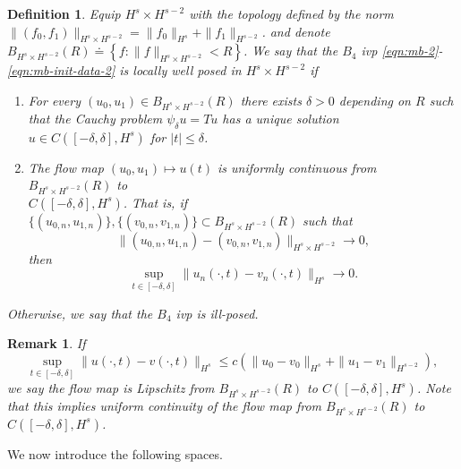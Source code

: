 \documentclass[12pt,reqno]{amsart}
\numberwithin{equation}{section}  %
\newtheorem{definition}[theorem]{Definition}
\newtheorem{remark}[theorem]{Remark}
\begin{document}
\begin{definition}
  Equip $H^{s} \times H^{s-2}$ with the 
  topology defined by the norm $\|(f_0, f_1)\|_{H^{s} \times H^{s-2}}
  = \|f_0\|_{H^{s}} + \|f_1\|_{H^{s-2}}$.
  and denote $B_{H^{s} \times H^{s-2}}(R) \doteq \left\{ f: \| f \|_{H^{s} \times
  H^{s-2}} < R
  \right\}$. We say that the $B_{4}$ ivp
  \eqref{eqn:mb-2}-\eqref{eqn:mb-init-data-2} is
	\emph{locally well posed} in
  $H^s \times H^{s-2}$ if 
	\begin{enumerate}
    \item For every $(u_{0}, u_{1}) \in B_{H^{s} \times H^{s-2}}(R)$
      there exists $\delta>0$ depending on $R$ such that the Cauchy problem
      $\psi_{\delta} u = Tu$ has a unique solution $u \in C([-\delta,
      \delta], H^s)$ for $ |t| \le \delta$.
    \item
      The flow map $(u_0, u_{1}) \mapsto u(t)$ is uniformly continuous from
      $B_{H^{s} \times H^{s-2}}(R)$ to \\ $C(\left[ -\delta, \delta \right], H^s)$. That is, if
      $\{(u_{0,n}, u_{1,n} ) \}, \{(v_{0,n}, v_{1,n} )\}
      \subset B_{H^{s} \times H^{s-2}}(R)$ such that $$\|(u_{0,n}, u_{1,n}) -
      (v_{0,n}, v_{1,n}) \|_{H^{s} \times H^{s-2}} \to 0,$$ then 
      $$\sup_{t \in [-\delta, \delta]}
      \|u_{n}(\cdot, t) - v_{n}(\cdot, t) \|_{H^s} \to 0.$$
  \end{enumerate}
	Otherwise, we say that the $B_{4}$ ivp is \emph{ill-posed}.
\end{definition}
%
%
\begin{framed}
\begin{remark}
  If $$\sup_{t \in [-\delta, \delta]}\|u(\cdot, t) - v(\cdot, t)
  \|_{H^{s}} \le c \left( \|u_{0} - v_0 \|_{H^{s}} + \|u_{1} - v_1 \|_{H^{s-2}}
  \right),$$ we
  say the flow map is \emph{Lipschitz} from $B_{H^{s} \times H^{s-2}}(R)$ 
  to $C(\left[ -\delta, \delta \right], H^s)$. 
%
%
Note that this implies uniform continuity of the flow map from $B_{H^{s}
\times H^{s-2}}(R)$ to $C(\left[ -\delta, \delta \right], H^s)$.
\label{rem:lipschitz-cont}
\end{remark}
\end{framed}
%
%
We now introduce the following spaces. 
%
%
\end{document}
